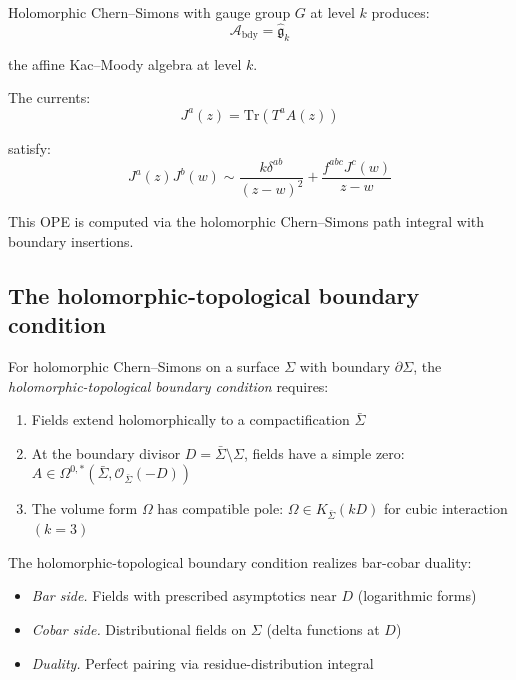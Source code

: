 \begin{example}
Holomorphic Chern--Simons with gauge group $G$ at level $k$ produces:
\[\mathcal{A}_{\text{bdy}} = \widehat{\mathfrak{g}}_k\]

the affine Kac--Moody algebra at level $k$.

The currents:
\[J^a(z) = \text{Tr}(T^a A(z))\]

satisfy:
\[J^a(z) J^b(w) \sim \frac{k \delta^{ab}}{(z-w)^2} + 
\frac{f^{abc} J^c(w)}{z-w}\]

This OPE is computed via the holomorphic Chern--Simons path integral with
boundary insertions.
\end{example}

\subsection{The holomorphic-topological boundary condition}

\begin{definition}
For holomorphic Chern--Simons on a surface $\Sigma$ with boundary $\partial \Sigma$, 
the \emph{holomorphic-topological boundary condition} requires:
\begin{enumerate}
\item Fields extend holomorphically to a compactification $\bar{\Sigma}$
\item At the boundary divisor $D = \bar{\Sigma} \setminus \Sigma$, fields have 
a simple zero: $A \in \Omega^{0,*}(\bar{\Sigma}, \mathcal{O}_{\bar{\Sigma}}(-D))$
\item The volume form $\Omega$ has compatible pole: $\Omega \in K_{\bar{\Sigma}}(kD)$ 
for cubic interaction $(k=3)$
\end{enumerate}
\end{definition}

\begin{conjecture}
\label{conj:bar-cobar-ht-boundary}
The holomorphic-topological boundary condition realizes bar-cobar duality:
\begin{itemize}
\item \emph{Bar side.} Fields with prescribed asymptotics near $D$ (logarithmic
forms)
\item \emph{Cobar side.} Distributional fields on $\Sigma$ (delta functions at $D$)
\item \emph{Duality.} Perfect pairing via residue-distribution integral
\end{itemize}
\end{conjecture}

